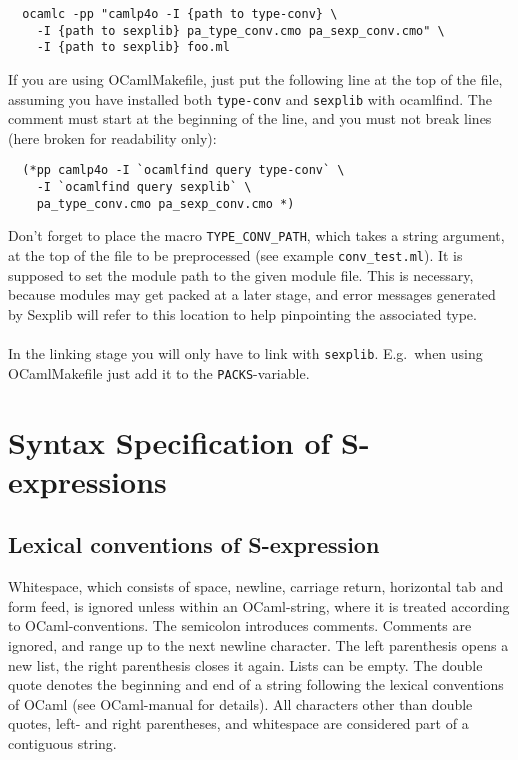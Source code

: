 \documentclass[a4paper]{article}
\begin{document}
\begin{verbatim}
  ocamlc -pp "camlp4o -I {path to type-conv} \
    -I {path to sexplib} pa_type_conv.cmo pa_sexp_conv.cmo" \
    -I {path to sexplib} foo.ml
\end{verbatim}

If you are using OCamlMakefile, just put the following line at the
top of the file, assuming you have installed both \verb=type-conv= and
\verb=sexplib= with ocamlfind.  The comment must start at the beginning of
the line, and you must not break lines (here broken for readability only):

\begin{verbatim}
  (*pp camlp4o -I `ocamlfind query type-conv` \
    -I `ocamlfind query sexplib` \
    pa_type_conv.cmo pa_sexp_conv.cmo *)
\end{verbatim}

Don't forget to place the macro \verb=TYPE_CONV_PATH=, which takes a
string argument, at the top of the file to be preprocessed (see example
\verb=conv_test.ml=).  It is supposed to set the module path to the given
module file.  This is necessary, because modules may get packed at a later
stage, and error messages generated by Sexplib will refer to this location
to help pinpointing the associated type.\\
\\
In the linking stage you will only have to link with \verb=sexplib=.
E.g.\ when using OCamlMakefile just add it to the \verb=PACKS=-variable.

\section{Syntax Specification of S-expressions}

\subsection{Lexical conventions of S-expression}

Whitespace, which consists of space, newline, carriage return, horizontal
tab and form feed, is ignored unless within an OCaml-string, where it
is treated according to OCaml-conventions.  The semicolon introduces
comments.  Comments are ignored, and range up to the next newline
character.  The left parenthesis opens a new list, the right parenthesis
closes it again.  Lists can be empty.  The double quote denotes the
beginning and end of a string following the lexical conventions of OCaml
(see OCaml-manual for details).  All characters other than double quotes,
left- and right parentheses, and whitespace are considered part of a
contiguous string.
\end{document}
